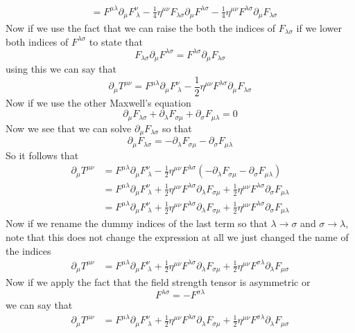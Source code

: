 \documentclass[11pt]{article}
\numberwithin{equation}{section}
\begin{document}
\begin{enumerate}[(a)]
\begin{align*}
&= F^{\mu\lambda}\partial_{\mu}F^{\nu}_{\ \lambda} -  \frac{1}{4}\eta^{\mu\nu}F_{\lambda\sigma}\partial_{\mu}F^{\lambda\sigma} - \frac{1}{4}\eta^{\mu\nu}F^{\lambda\sigma}\partial_{\mu}F_{\lambda\sigma}
\end{align*}
Now if we use the fact that we can raise the both the indices of $F_{\lambda\sigma}$ if we lower both indices of $F^{\lambda\sigma}$ to state that
$$F_{\lambda\sigma}\partial_{\mu}F^{\lambda\sigma} = F^{\lambda\sigma}\partial_{\mu}F_{\lambda\sigma}$$
using this we can say that
$$\partial_{\mu}T^{\mu\nu} = F^{\mu\lambda}\partial_{\mu}F^{\nu}_{\ \lambda} - \frac{1}{2}\eta^{\mu\nu}F^{\lambda\sigma}\partial_{\mu}F_{\lambda\sigma}$$
Now if we use the other Maxwell's equation
$$\partial_{\mu}F_{\lambda\sigma} + \partial_{\lambda}F_{\sigma\mu} + \partial_{\sigma}F_{\mu\lambda} =0 $$
Now we see that we can solve $\partial_{\mu}F_{\lambda\sigma}$ so that
$$\partial_{\mu}F_{\lambda\sigma} =  -\partial_{\lambda}F_{\sigma\mu} - \partial_{\sigma}F_{\mu\lambda}$$
So it follows that 
\begin{align*}
\partial_{\mu}T^{\mu\nu} &= F^{\mu\lambda}\partial_{\mu}F^{\nu}_{\ \lambda} - \frac{1}{2}\eta^{\mu\nu}F^{\lambda\sigma}\left(-\partial_{\lambda}F_{\sigma\mu} - \partial_{\sigma}F_{\mu\lambda}\right)\\
&= F^{\mu\lambda}\partial_{\mu}F^{\nu}_{\ \lambda} + \frac{1}{2}\eta^{\mu\nu}F^{\lambda\sigma}\partial_{\lambda}F_{\sigma\mu} + \frac{1}{2}\eta^{\mu\nu}F^{\lambda\sigma}\partial_{\sigma}F_{\mu\lambda}\\
&= F^{\mu\lambda}\partial_{\mu}F^{\nu}_{\ \lambda} + \frac{1}{2}\eta^{\mu\nu}F^{\lambda\sigma}\partial_{\lambda}F_{\sigma\mu} + \frac{1}{2}\eta^{\mu\nu}F^{\lambda\sigma}\partial_{\sigma}F_{\mu\lambda}
\end{align*}
Now if we rename the dummy indices of the last term so that $\lambda\rightarrow\sigma$ and $\sigma\rightarrow\lambda$, note that this does not change the expression at all we just changed the name of the indices
\begin{align*}
\partial_{\mu}T^{\mu\nu} &= F^{\mu\lambda}\partial_{\mu}F^{\nu}_{\ \lambda} + \frac{1}{2}\eta^{\mu\nu}F^{\lambda\sigma}\partial_{\lambda}F_{\sigma\mu} + \frac{1}{2}\eta^{\mu\nu}F^{\sigma\lambda}\partial_{\lambda}F_{\mu\sigma}
\end{align*}
Now if we apply the fact that the field strength tensor is asymmetric or
$$F^{\lambda\sigma} = -F^{\sigma\lambda}$$
we can say that
\begin{align*}
\partial_{\mu}T^{\mu\nu} &= F^{\mu\lambda}\partial_{\mu}F^{\nu}_{\ \lambda} + \frac{1}{2}\eta^{\mu\nu}F^{\lambda\sigma}\partial_{\lambda}F_{\sigma\mu} + \frac{1}{2}\eta^{\mu\nu}F^{\sigma\lambda}\partial_{\lambda}F_{\mu\sigma}\\

\end{align*}
\end{enumerate}
\end{document}
